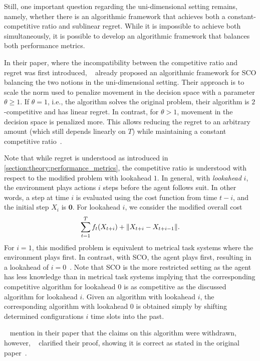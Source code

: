 Still, one important question regarding the uni-dimensional setting remains, namely, whether there is an algorithmic framework that achieves both a constant-competitive ratio and sublinear regret. While it is impossible to achieve both simultaneously, it is possible to develop an algorithmic framework that balances both performance metrics.

In their paper, where the incompatibility between the competitive ratio and regret was first introduced, \citeauthor*{Andrew2015}~\cite{Andrew2015} already proposed an algorithmic framework for SCO balancing the two notions in the uni-dimensional setting. Their approach is to scale the norm used to penalize movement in the decision space with a parameter $\theta \geq 1$. If $\theta = 1$, i.e., the algorithm solves the original problem, their algorithm is $2$-competitive and has linear regret. In contrast, for $\theta > 1$, movement in the decision space is penalized more. This allows reducing the regret to an arbitrary amount (which still depends linearly on $T$) while maintaining a constant competitive ratio~\cite{Andrew2015}.

Note that while regret is understood as introduced in \cref{section:theory:performance_metrics}, the competitive ratio is understood with respect to the modified problem with lookahead $1$. In general, with \emph{lookahead} $i$, the environment plays actions $i$ steps before the agent follows suit. In other words, a step at time $i$ is evaluated using the cost function from time $t-i$, and the initial step $X_i$ is $\mathbf{0}$. For lookahead $i$, we consider the modified overall cost \begin{align*}
    \sum_{t=1}^T f_t(X_{t+i}) + \lVert X_{t+i} - X_{t+i-1}\rVert.
\end{align*} For $i=1$, this modified problem is equivalent to metrical task systems where the environment plays first. In contrast, with SCO, the agent plays first, resulting in a lookahead of $i=0$~\cite{Andrew2015}. Note that SCO is the more restricted setting as the agent has less knowledge than in metrical task systems implying that the corresponding competitive algorithm for lookahead $0$ is as competitive as the discussed algorithm for lookahead $i$. Given an algorithm with lookahead $i$, the corresponding algorithm with lookahead $0$ is obtained simply by shifting determined configurations $i$ time slots into the past.

\citeauthor*{Bansal2015}~\cite{Bansal2015} mention in their paper that the claims on this algorithm were withdrawn, however, \citeauthor*{Andrew2015}~\cite{Andrew2015} clarified their proof, showing it is correct as stated in the original paper~\cite{Wierman}.

